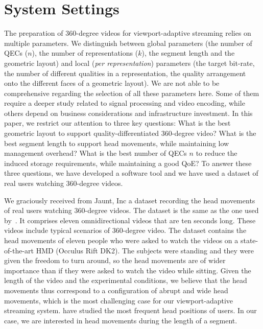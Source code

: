 \newcommand\testbitrateBudget{6}
\newcommand\testbitrateBudgetPercentage{\SI{75}{\percent}}
\section{System Settings}
\label{sec:settings}

The preparation of 360-degree videos for viewport-adaptive streaming
relies on multiple parameters. We distinguish between global
parameters (the number of \acp{QEC} ($n$), the number of
representations ($k$), the segment length and the geometric layout)
and local (\emph{per representation}) parameters (the target bit-rate,
the number of different qualities in a representation, the quality
arrangement onto the different faces of a geometric layout). We are
not able to be comprehensive regarding the selection of all these
parameters here. Some of them require a deeper study related to signal
processing and video encoding, while others depend on business
considerations and infrastructure investment. In this paper, we
restrict our attention to three key questions: What is the best
geometric layout to support quality-differentiated 360-degree video?
What is the best segment length to support head movements, while
maintaining low management overhead? What is the best number of
\acp{QEC} $n$ to reduce the induced storage requirements, while
maintaining a good \ac{QoE}? To answer these three questions, we have
developed a software tool and we have used a dataset of real users
watching 360-degree videos.


We graciously received from Jaunt, Inc a dataset
recording the head movements of real users watching 360-degree videos.
The dataset is the same as the one used by~\citet{yu_framework_2015}. It comprises
eleven omnidirectional videos that are ten seconds long. These videos
include typical scenarios of 360-degree video. The dataset contains
the head movements of eleven people who were asked to watch the videos
on a state-of-the-art \ac{HMD} (Occulus Rift DK2). The subjects were
standing and they were given the freedom to turn around, so the head
movements are of wider importance than if they were asked to watch the
video while sitting. Given the length of the video and the
experimental conditions, we believe that the head movements thus
correspond to a configuration of abrupt and wide head movements, which
is the most challenging case for our viewport-adaptive streaming
system. \citet{yu_framework_2015} have studied the most frequent head
positions of users. In our case, we are interested in head movements
during the length of a segment.

